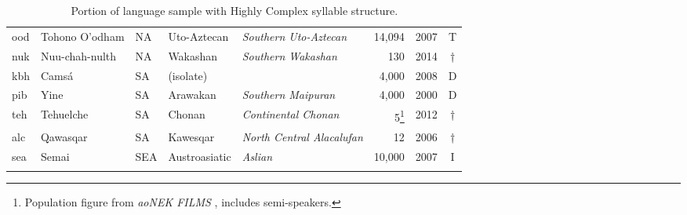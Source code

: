 \begin{table}
\begin{tabularx}{\textwidth}{lQlQQrlc}
 ood & {{Tohono O’odham}} &  NA & {Uto-Aztecan} & {\textit{Southern Uto-Aztecan}} &  14,094 & 2007 & T\\
 nuk & {{Nuu-chah-nulth}} &  NA & {Wakashan} & {\textit{Southern Wakashan}} &  130 & 2014 & †\\
 kbh & {{Camsá}} &  SA & {(isolate)} &  &  4,000 & 2008 & D\\
 pib & {{Yine}} &  SA & {Arawakan} & {\textit{Southern Maipuran}} &  4,000 & 2000 & D\\
 teh & {{Tehuelche}} &  SA & {Chonan} & {\textit{Continental Chonan}} &  5\footnote{Population figure from \textit{aoNEK FILMS} , includes semi-speakers.} & 2012 & †\\
 alc & {{Qawasqar}} &  SA & {Kawesqar} & {\textit{North Central Alacalufan}} &  12 & 2006 & †\\
 sea & {{Semai}} &  SEA  & {Austroasiatic} & {\textit{Aslian}} &  10,000 & 2007 & I\\
\lspbottomrule
\end{tabularx}
\caption{Portion of language sample with Highly Complex syllable structure.\label{tab:A.4}}
\end{table}
